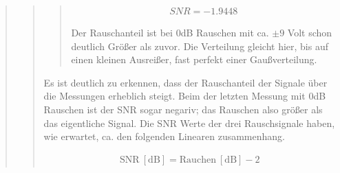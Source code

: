 \begin{quote}
\begin{quote}
\begin{quote}
            \begin{equation*}
            \begin{split}
                 SNR = -1.9448
            \end{split}
            \end{equation*}
            
            Der Rauschanteil ist bei 0dB Rauschen mit ca. $\pm9$ Volt schon deutlich Größer als zuvor. Die Verteilung gleicht
            hier, bis auf einen kleinen Ausreißer, fast perfekt einer Gaußverteilung.
            
        \end{quote}
        
        \vspace{4em}
        
        Es ist deutlich zu erkennen, dass der Rauschanteil der Signale über die Messungen erheblich steigt.
        Beim der letzten Messung mit 0dB Rauschen ist der SNR sogar negariv; das Rauschen also größer als das eigentliche Signal.
        Die SNR Werte der drei Rauschsignale haben, wie erwartet, ca. den folgenden Linearen zusammenhang.
        
        \begin{equation*}
    	\begin{split}
    		\mathrm{SNR \ [dB]} = \mathrm{Rauchen \ [dB]} - 2 
    	\end{split}
        \end{equation*}
        
     
    \end{quote}
    
    
\end{quote}





%     
%         

% 
% 
% 



